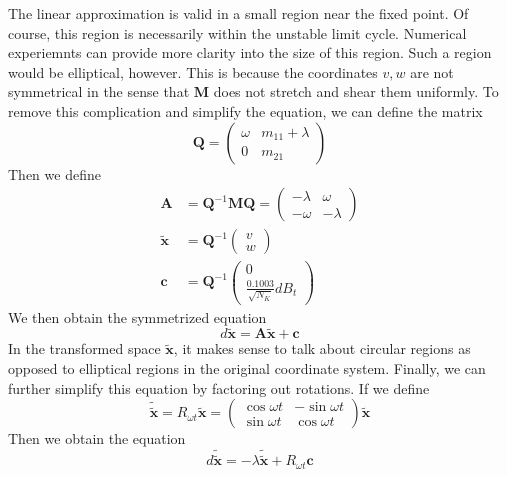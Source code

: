 \documentclass[letterpaper,12pt]{article}
\numberwithin{table}{section}
\numberwithin{figure}{section}
\numberwithin{equation}{section}
\newcommand*{\qvec}[2]{\begin{pmatrix} #1 \\ #2 \end{pmatrix}}
\newcommand*{\qmat}[4]{\begin{pmatrix} #1 & #2 \\ #3 & #4 \end{pmatrix}}
\begin{document}
\begin{flushleft}
    The linear approximation is valid in a small region near the fixed point. Of course, this region is necessarily within the unstable limit cycle. Numerical experiemnts can provide more clarity into the size of this region. Such a region would be elliptical, however. This is because the coordinates $v, w$ are not symmetrical in the sense that $\mathbf{M}$ does not stretch and shear them uniformly. To remove this complication and simplify the equation, we can define the matrix
    \begin{equation}
        \mathbf{Q} = \qmat{\omega}{m_{11} + \lambda}{0}{m_{21}}
    \end{equation}
    Then we define
    \begin{align}
        \mathbf{A} &= \mathbf{Q}^{-1}\mathbf{M}\mathbf{Q} = \qmat{-\lambda}{\omega}{-\omega}{-\lambda} \\
        \tilde{\mathbf{x}} &= \mathbf{Q}^{-1}\qvec{v}{w} \\
        \mathbf{c} &= \mathbf{Q}^{-1} \qvec{0}{\frac{0.1003}{\sqrt{N_K}} dB_t}
    \end{align}
    We then obtain the symmetrized equation
    \begin{equation}
        d\tilde{\mathbf{x}} = \mathbf{A}\tilde{\mathbf{x}} + \mathbf{c}
    \end{equation}
    In the transformed space $\tilde{\mathbf{x}}$, it makes sense to talk about circular regions as opposed to elliptical regions in the original coordinate system. Finally, we can further simplify this equation by factoring out rotations. If we define
    \begin{equation}
        \tilde{\tilde{\mathbf{x}}} = R_{\omega t} \tilde{\mathbf{x}} = \qmat{\cos\omega t}{-\sin\omega t}{\sin\omega t}{\cos\omega t} \tilde{\mathbf{x}}
    \end{equation}
    Then we obtain the equation
    \begin{equation}
        d\tilde{\tilde{\mathbf{x}}} = -\lambda\tilde{\tilde{\mathbf{x}}} + R_{\omega t}\mathbf{c}
    \end{equation}


\end{flushleft}
\end{document}
